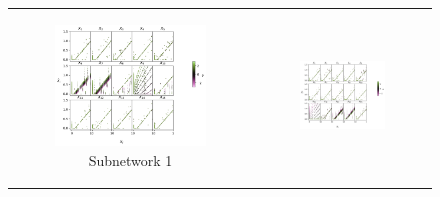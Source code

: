 \documentclass{article}
\theoremstyle{plain}
\theoremstyle{definition}
\theoremstyle{remark}
\begin{document}
\begin{figure}[ht]
    \centering
    \caption{Effect of intervening on the first 5 subnetworks of the TMS-in-parallel model.}
    \label{fig:s3_tms_interventions}

    \begin{minipage}{\textwidth} %
        \centering
        \begin{tabular}{cc}  %
            \begin{subfigure}{0.3\textwidth}
                \centering
                \includegraphics[width=\linewidth]{../figures/s4_tms_intervention_network1.pdf}
                \caption{Subnetwork 1}
            \end{subfigure} &
            \begin{subfigure}{0.3\textwidth}
                \centering
                \includegraphics[width=\linewidth]{../figures/s4_tms_intervention_network2.pdf}

\end{subfigure}
\end{tabular}
\end{minipage}
\end{figure}
\end{document}
